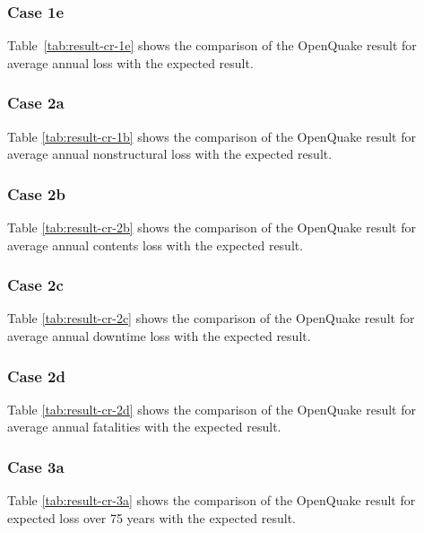 \subsubsection{Case 1e}


Table~\ref{tab:result-cr-1e} shows the comparison of the OpenQuake result for average annual loss with the expected result.

\subsubsection{Case 2a}


Table \ref{tab:result-cr-1b} shows the comparison of the OpenQuake result for average annual nonstructural loss with the expected result.

\subsubsection{Case 2b}


Table \ref{tab:result-cr-2b} shows the comparison of the OpenQuake result for average annual contents loss with the expected result.

\subsubsection{Case 2c}


Table \ref{tab:result-cr-2c} shows the comparison of the OpenQuake result for average annual downtime loss with the expected result.

\subsubsection{Case 2d}


Table \ref{tab:result-cr-2d} shows the comparison of the OpenQuake result for average annual fatalities with the expected result.

\subsubsection{Case 3a}


Table \ref{tab:result-cr-3a} shows the comparison of the OpenQuake result for expected loss over 75 years with the expected result.

